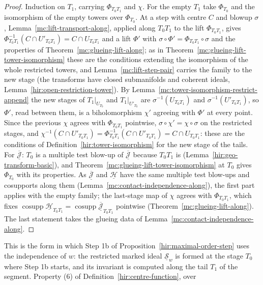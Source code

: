 \begin{proof}
\leanok
Induction on \(T_1\), carrying \(\Phi_{T_0T_1}\) and \(\chi\). For the empty \(T_1\) take \(\Phi_{T_0}\) and the isomorphism of the empty towers over \(\Phi_{T_0}\). At a step with centre \(C\)
and blowup \(\sigma\), Lemma~\ref{mc:lift-transport-along}, applied along \(T_0T_1\) to the lift \(\Phi_{T_0T_1}\), gives \(\Phi_{T_0T_1}^{-1}(C\cap U'_{T_0T_1})=C\cap U_{T_0T_1}\) and a lift
\(\Phi'\) with \(\sigma\circ\Phi'=\Phi_{T_0T_1}\circ\sigma\) and the properties of Theorem~\ref{mc:glueing-lift-along}; as in Theorem~\ref{mc:glueing-lift-tower-isomorphism} these
are the conditions extending the isomorphism of the whole restricted towers, and Lemma~\ref{mc:lift-step-pair} carries the family to the new stage (the transforms have closed
submanifolds and coherent ideals, Lemma~\ref{hir:open-restriction-tower}). By Lemma~\ref{mc:tower-isomorphism-restrict-append} the new stages of \(T_1|_{U_{T_0}}\) and
\(T_1|_{U'_{T_0}}\) are \(\sigma^{-1}(U_{T_0T_1})\) and \(\sigma^{-1}(U'_{T_0T_1})\), so \(\Phi'\), read between them, is a biholomorphism \(\chi'\) agreeing with \(\Phi'\) at every point.
Since the previous \(\chi\) agrees with \(\Phi_{T_0T_1}\) pointwise, \(\sigma\circ\chi'=\chi\circ\sigma\) on the restricted stages, and
\(\chi^{-1}(C\cap U'_{T_0T_1})=\Phi_{T_0T_1}^{-1}(C\cap U'_{T_0T_1})=C\cap U_{T_0T_1}\): these are the conditions of Definition~\ref{hir:tower-isomorphism} for the new stage of the tails.
For \(\overline{\underline{\mathcal J}}\): \(T_0\) is a multiple test blow-up of \(\overline{\underline{\mathcal J}}\) because \(T_0T_1\) is (Lemma~\ref{hir:geo-transform-basic}), and
Theorem~\ref{mc:glueing-lift-tower-isomorphism} at \(T_0\) gives \(\Phi_{T_0}\) with its properties. As \(\overline{\underline{\mathcal J}}\) and \(\underline{\mathcal H}\) have the same multiple
test blow-ups and cosupports along them (Lemma~\ref{mc:contact-independence-along}), the first part applies with the empty family; the last-stage map of \(\chi\) agrees with
\(\Phi_{T_0T_1}\), which fixes \(\operatorname{cosupp}\underline{\mathcal H}_{T_0T_1}=\operatorname{cosupp}\overline{\underline{\mathcal J}}_{T_0T_1}\) pointwise
(Theorem~\ref{mc:glueing-lift-along}). The last statement takes the glueing data of Lemma~\ref{mc:contact-independence-along}.
\end{proof}
This is the form in which Step 1b of Proposition~\ref{hir:maximal-order-step} uses the independence of \(w\): the restricted marked ideal \(\underline{\mathcal S}_{w}\) is formed at
the stage \(T_0\) where Step 1b starts, and its invariant is computed along the tail \(T_1\) of the segment. Property (6) of Definition~\ref{hir:centre-function}, over
